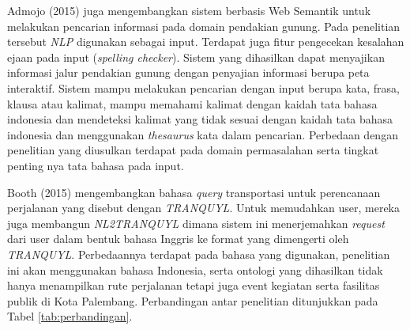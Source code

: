 Admojo (2015) juga mengembangkan sistem berbasis Web Semantik untuk melakukan pencarian informasi pada domain pendakian gunung. Pada penelitian tersebut \emph{NLP} digunakan sebagai input. Terdapat juga fitur pengecekan kesalahan ejaan pada input (\emph{spelling checker}). Sistem yang dihasilkan dapat menyajikan informasi jalur pendakian gunung dengan penyajian informasi berupa peta interaktif. Sistem mampu melakukan pencarian dengan input berupa kata, frasa, klausa atau kalimat, mampu memahami kalimat dengan kaidah tata bahasa indonesia dan mendeteksi kalimat yang tidak sesuai dengan kaidah tata bahasa indonesia dan menggunakan \emph{thesaurus} kata dalam pencarian. Perbedaan dengan penelitian yang diusulkan terdapat pada domain permasalahan serta tingkat penting nya tata bahasa pada input.

Booth (2015) mengembangkan bahasa \emph{query} transportasi untuk perencanaan perjalanan yang disebut dengan \emph{TRANQUYL}. Untuk memudahkan user, mereka juga membangun \emph{NL2TRANQUYL} dimana sistem ini menerjemahkan \emph{request} dari user dalam bentuk bahasa Inggris ke format yang dimengerti oleh \emph{TRANQUYL}. Perbedaannya terdapat pada bahasa yang digunakan, penelitian ini akan menggunakan bahasa Indonesia, serta ontologi yang dihasilkan tidak hanya menampilkan rute perjalanan tetapi juga event kegiatan serta fasilitas publik di Kota Palembang. Perbandingan antar penelitian ditunjukkan pada Tabel \ref{tab:perbandingan}.\\


